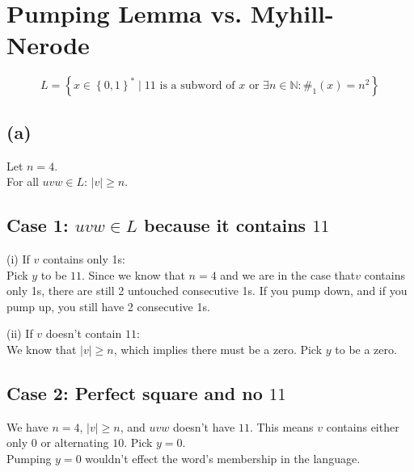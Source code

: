 




\section{Pumping Lemma vs. Myhill-Nerode}

$$L = \left\{ x \in \left\{0,1\right\}^{\ast} \mid 11\text{ is a subword of }x\text{ or } \exists n \in \mathbb{N}:\#_{1}(x)=n^{2}\right\}$$

\subsection{(a)}
Let \( n = 4 \). \\
For all \( uvw \in L \): \( |v| \geq n \).

\subsection*{Case 1: \( uvw \in L \) because it contains \( 11 \)}


    (i) If \( v \) contains only 1s:\\ Pick \( y \) to be \( 11 \). Since we know that \( n = 4 \) and we are in the case that\( v \) contains only 1s, there are still 2 untouched consecutive 1s. If you pump down, and if you pump up, you still have 2 consecutive 1s.
    
    (ii) If \( v \) doesn’t contain \( 11 \):\\
        We know that \( |v| \geq n \), which implies there must be a zero. Pick \( y \) to be a zero.
    


\subsection*{Case 2: Perfect square and no \( 11 \)}

We have \( n = 4 \), \( |v| \geq n \), and \( uvw \) doesn’t have \( 11 \). This means \( v \) contains either only 0 or alternating \( 10 \). Pick \( y = 0 \).\\
Pumping \( y = 0 \) wouldn’t effect the word’s membership in the language.


